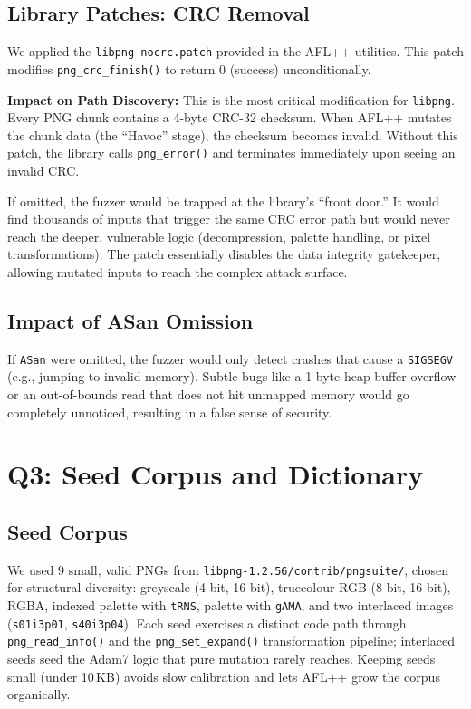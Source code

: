 \documentclass[letterpaper,twocolumn,10pt]{article}
\begin{document}
\subsection{Library Patches: CRC Removal}
We applied the \texttt{libpng-nocrc.patch} provided in the AFL++ utilities. This
patch modifies \texttt{png\_crc\_finish()} to return 0 (success) unconditionally.

\textbf{Impact on Path Discovery:} This is the most critical modification for
\texttt{libpng}. Every PNG chunk contains a 4-byte CRC-32 checksum. When AFL++
mutates the chunk data (the ``Havoc'' stage), the checksum becomes invalid.
Without this patch, the library calls \texttt{png\_error()} and terminates
immediately upon seeing an invalid CRC.

If omitted, the fuzzer would be trapped at the library's ``front door.'' It would
find thousands of inputs that trigger the same CRC error path but would never
reach the deeper, vulnerable logic (decompression, palette handling, or pixel
transformations). The patch essentially disables the data integrity gatekeeper,
allowing mutated inputs to reach the complex attack surface.

\subsection{Impact of ASan Omission}
If \texttt{ASan} were omitted, the fuzzer would only detect crashes that cause a
\texttt{SIGSEGV} (e.g., jumping to invalid memory). Subtle bugs like a 1-byte
heap-buffer-overflow or an out-of-bounds read that does not hit unmapped memory
would go completely unnoticed, resulting in a false sense of security.



\section{Q3: Seed Corpus and Dictionary}

\subsection{Seed Corpus}
We used 9 small, valid PNGs from \texttt{libpng-1.2.56/contrib/pngsuite/},
chosen for structural diversity: greyscale (4-bit, 16-bit), truecolour RGB
(8-bit, 16-bit), RGBA, indexed palette with \texttt{tRNS}, palette with
\texttt{gAMA}, and two interlaced images (\texttt{s01i3p01}, \texttt{s40i3p04}).
Each seed exercises a distinct code path through \texttt{png\_read\_info()} and
the \texttt{png\_set\_expand()} transformation pipeline; interlaced seeds seed
the Adam7 logic that pure mutation rarely reaches. Keeping seeds small (under
10\,KB) avoids slow calibration and lets AFL++ grow the corpus organically.
\end{document}
